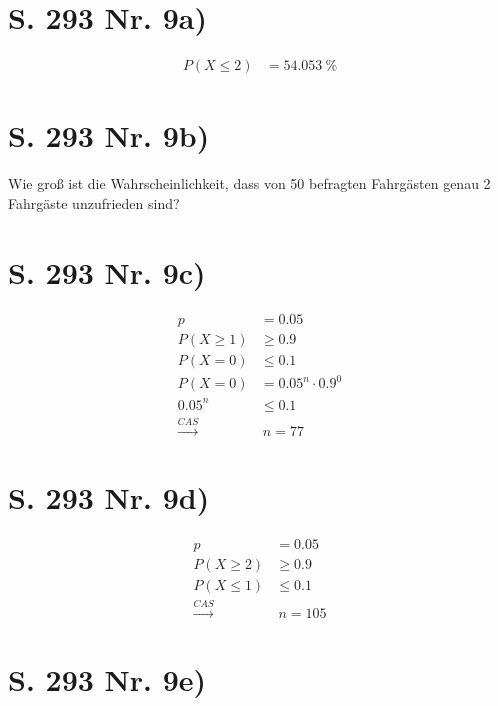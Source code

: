 \documentclass[12pt,a4paper]{report}
\begin{document}
	\section{S. 293 Nr. 9a)}
	\begin{align*}
		P(X \leq 2) &= 54.053\ \%
	\end{align*}
	\section{S. 293 Nr. 9b)}
	Wie groß ist die Wahrscheinlichkeit, dass von 50 befragten Fahrgästen genau 2 Fahrgäste unzufrieden sind?
	\section{S. 293 Nr. 9c)}
	\begin{align*}
		p &= 0.05 \\
		P(X \geq 1) &\geq 0.9 \\
		P(X = 0) &\leq 0.1 \\
		P(X = 0) &= 0.05^{n} \cdot 0.9^0 \\
		0.05^n &\leq 0.1 \\
		\xrightarrow{CAS} &\ n = 77
	\end{align*}
	\section{S. 293 Nr. 9d)}
	\begin{align*}
		p &= 0.05 \\
		P(X \geq 2) &\geq 0.9 \\
		P(X \leq 1) &\leq 0.1 \\
		\xrightarrow{CAS} &\ n = 105
	\end{align*}
	\section{S. 293 Nr. 9e)}
	
\end{document}
